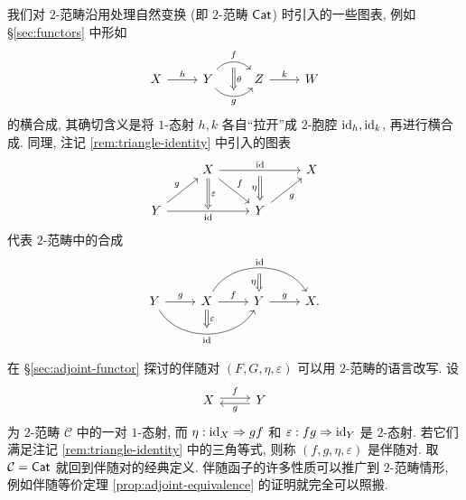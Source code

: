 \begin{convention}
	我们对 $2$-范畴沿用处理自然变换 (即 $2$-范畴 $\mathsf{Cat}$) 时引入的一些图表, 例如 \S\ref{sec:functors} 中形如
	\[ \begin{tikzcd}
		X \arrow[r, "h"] & Y \arrow[bend left=50, r, "f", ""' name=U] \arrow[bend right=50, r, "" name=D, "g"'] & Z \arrow[Rightarrow, to path=(U)--(D) \tikztonodes, "\theta"] \arrow[r, "k"] & W
	\end{tikzcd} \]
	的横合成, 其确切含义是将 $1$-态射 $h, k$ 各自``拉开''成 $2$-胞腔 $\mathrm{id}_h, \mathrm{id}_k$, 再进行横合成. 同理, 注记 \ref{rem:triangle-identity} 中引入的图表
	\[\begin{tikzcd}
		{} & X \arrow[rr, "\identity", ""' name=I] \arrow[rd, "f"] \arrow[Rightarrow, d, "\varepsilon"] & & X \\
		Y \arrow[ru, "g"] \arrow[rr, "" name=J, "\identity"'] & {} & Y \arrow[ru, "g"'] \arrow[Leftarrow, to path= -- (I) \tikztonodes, "\eta"] &
	\end{tikzcd} \]
	代表 $2$-范畴中的合成
	\[ \begin{tikzcd}
		Y \arrow[r, "g"] \arrow[bend right=60, rr, "" name=J, "\identity"'] &
		X \arrow[r, "f"] \arrow[bend left=60, rr, "\identity", ""' name=I] \arrow[Rightarrow, to path= --(J) \tikztonodes, "\varepsilon"] &
		Y \arrow[r, "g"] \arrow[Leftarrow, to path= -- (I) \tikztonodes, "\eta"] &
		X .
	\end{tikzcd} \]
\end{convention}

\begin{remark}
	在 \S\ref{sec:adjoint-functor} 探讨的伴随对 $(F, G, \eta, \varepsilon)$ 可以用 $2$-范畴的语言改写. 设
	\[\begin{tikzcd}
		X \arrow[yshift=0.5ex, r, "f"] & Y \arrow[yshift=-0.5ex, l, "g"]
	\end{tikzcd}\]
	为 $2$-范畴 $\mathcal{C}$ 中的一对 $1$-态射, 而 $\eta: \mathrm{id}_X \Rightarrow gf$ 和 $\varepsilon: fg \Rightarrow \mathrm{id}_Y$ 是 $2$-态射. 若它们满足注记 \ref{rem:triangle-identity} 中的三角等式, 则称 $(f, g, \eta, \varepsilon)$ 是伴随对. 取 $\mathcal{C} = \mathsf{Cat}$ 就回到伴随对的经典定义. 伴随函子的许多性质可以推广到 $2$-范畴情形, 例如伴随等价定理 \ref{prop:adjoint-equivalence} 的证明就完全可以照搬.
\end{remark}

